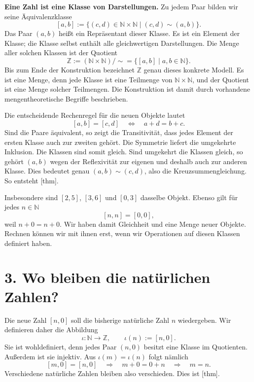 \medskip\noindent\textbf{Eine Zahl ist eine Klasse von Darstellungen.}
Zu jedem Paar bilden wir seine Äquivalenzklasse
\[
  [a,b]:=\{(c,d)\in\mathbb N\times\mathbb N
                    \mid(c,d)\sim(a,b)\}.
\]
Das Paar \((a,b)\) heißt ein Repräsentant dieser Klasse. Es ist
ein Element der Klasse; die Klasse selbst enthält alle gleichwertigen
Darstellungen. Die Menge aller solchen Klassen ist der Quotient
\[
  \mathbb Z:=(\mathbb N\times\mathbb N)/{\sim}
             =\{[a,b]\mid a,b\in\mathbb N\}.
\]
Bis zum Ende der Konstruktion bezeichnet \(\mathbb Z\) genau dieses
konkrete Modell. Es ist eine Menge, denn jede Klasse ist eine Teilmenge
von \(\mathbb N\times\mathbb N\), und der Quotient ist eine Menge
solcher Teilmengen. Die Konstruktion ist damit durch vorhandene
mengentheoretische Begriffe beschrieben.

\IntegersPairGrid

Die entscheidende Rechenregel für die neuen Objekte lautet
\[
  [a,b]=[c,d]
  \quad\Longleftrightarrow\quad
  a+d=b+c.
\]
Sind die Paare äquivalent, so zeigt die Transitivität, dass jedes
Element der ersten Klasse auch zur zweiten gehört. Die Symmetrie
liefert die umgekehrte Inklusion. Die Klassen sind somit gleich.
Sind umgekehrt die Klassen gleich, so gehört \((a,b)\) wegen der
Reflexivität zur eigenen und deshalb auch zur anderen Klasse. Dies
bedeutet genau \((a,b)\sim(c,d)\), also die Kreuzsummengleichung.
So entsteht [thm].

Insbesondere sind \([2,5]\), \([3,6]\) und \([0,3]\) dasselbe
Objekt. Ebenso gilt für jedes \(n\in\mathbb N\)
\[
  [n,n]=[0,0],
\]
weil \(n+0=n+0\). Wir haben damit Gleichheit und eine Menge neuer
Objekte. Rechnen können wir mit ihnen erst, wenn wir Operationen auf
diesen Klassen definiert haben.

\par{}
\hypertarget{integers.reading.embedding}{}
\section*{3. Wo bleiben die natürlichen Zahlen?}

Die neue Zahl \([n,0]\) soll die bisherige natürliche Zahl \(n\)
wiedergeben. Wir definieren daher die Abbildung
\[
  \iota\colon\mathbb N\longrightarrow\mathbb Z,
  \qquad \iota(n):=[n,0].
\]
Sie ist wohldefiniert, denn jedes Paar \((n,0)\) besitzt eine Klasse
im Quotienten. Außerdem ist sie injektiv. Aus
\(\iota(m)=\iota(n)\) folgt nämlich
\[
  [m,0]=[n,0]
  \quad\Longrightarrow\quad
  m+0=0+n
  \quad\Longrightarrow\quad m=n.
\]
Verschiedene natürliche Zahlen bleiben also verschieden. Dies ist
[thm].

